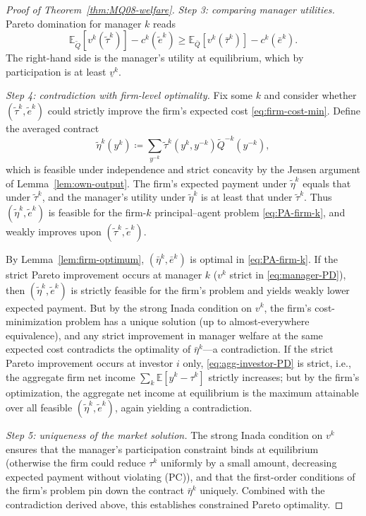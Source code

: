 \documentclass[11pt,a4paper,oneside]{book}
\def\E{\mathbb{E}}
\def\geq{\geqslant}
\theoremstyle{plain}
\theoremstyle{definition}
\theoremstyle{remark}
\numberwithin{equation}{chapter}
\begin{document}
\begin{proof}[Proof of Theorem~\ref{thm:MQ08-welfare}]
\emph{Step 3: comparing manager utilities.}
Pareto domination for manager $k$ reads
\begin{equation}\label{eq:manager-PD}
  \E_{\widetilde{Q}}[v^k(\widetilde{\tau}^k)] - c^k(\widetilde{e}^k) \geq \E_{\bar{Q}}[v^k(\bar{\tau}^k)] - c^k(\bar{e}^k).
\end{equation}
The right-hand side is the manager's utility at equilibrium, which by participation is at least $\underline{v}^k$.

\emph{Step 4: contradiction with firm-level optimality.}
Fix some $k$ and consider whether $(\widetilde{\tau}^k, \widetilde{e}^k)$ could strictly improve the firm's expected cost \eqref{eq:firm-cost-min}.
Define the averaged contract
\begin{equation*}
  \widetilde{\eta}^k(y^k) \coloneqq \sum_{y^{-k}} \widetilde{\tau}^k(y^k, y^{-k}) \widetilde{Q}^{-k}(y^{-k}),
\end{equation*}
which is feasible under independence and strict concavity by the Jensen argument of Lemma~\ref{lem:own-output}.
The firm's expected payment under $\widetilde{\eta}^k$ equals that under $\widetilde{\tau}^k$, and the manager's utility under $\widetilde{\eta}^k$ is at least that under $\widetilde{\tau}^k$.
Thus $(\widetilde{\eta}^k, \widetilde{e}^k)$ is feasible for the firm-$k$ principal--agent problem \eqref{eq:PA-firm-k}, and weakly improves upon $(\widetilde{\tau}^k, \widetilde{e}^k)$.

By Lemma~\ref{lem:firm-optimum}, $(\bar{\eta}^k, \bar{e}^k)$ is optimal in \eqref{eq:PA-firm-k}.
If the strict Pareto improvement occurs at manager $k$ ($v^k$ strict in \eqref{eq:manager-PD}), then $(\widetilde{\eta}^k, \widetilde{e}^k)$ is strictly feasible for the firm's problem and yields weakly lower expected payment.
But by the strong Inada condition on $v^k$, the firm's cost-minimization problem has a unique solution (up to almost-everywhere equivalence), and any strict improvement in manager welfare at the same expected cost contradicts the optimality of $\bar{\eta}^k$---a contradiction.
If the strict Pareto improvement occurs at investor $i$ only, \eqref{eq:agg-investor-PD} is strict, i.e., the aggregate firm net income $\sum_k \E[y^k - \tau^k]$ strictly increases; but by the firm's optimization, the aggregate net income at equilibrium is the maximum attainable over all feasible $(\widetilde{\eta}^k, \widetilde{e}^k)$, again yielding a contradiction.

\emph{Step 5: uniqueness of the market solution.}
The strong Inada condition on $v^k$ ensures that the manager's participation constraint binds at equilibrium (otherwise the firm could reduce $\tau^k$ uniformly by a small amount, decreasing expected payment without violating (PC)), and that the first-order conditions of the firm's problem pin down the contract $\bar{\eta}^k$ uniquely.
Combined with the contradiction derived above, this establishes constrained Pareto optimality.
\end{proof}
\end{document}
